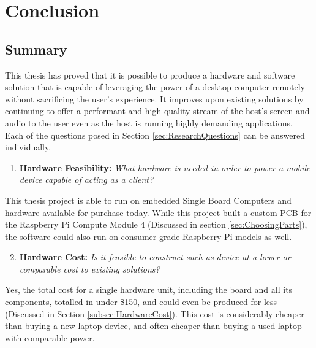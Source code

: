 \chapter{Conclusion} %

\label{Chapter7} %


\section{Summary}\label{sec:ConclusionSummary}

This thesis has proved that it is possible to produce a hardware and software solution that is capable of leveraging the power of a desktop computer remotely without sacrificing the user's experience.
It improves upon existing solutions by continuing to offer a performant and high-quality stream of the host's screen and audio to the user even as the host is running highly demanding applications.
Each of the questions posed in Section \ref{sec:ResearchQuestions} can be answered individually.

\begin{enumerate}
  \setcounter{enumi}{0} %
  \item \textbf{Hardware Feasibility:} \emph{What hardware is needed in order to power a mobile device capable of acting as a client?}
\end{enumerate}

\noindent
This thesis project is able to run on embedded Single Board Computers and hardware available for purchase today.
While this project built a custom PCB for the Raspberry Pi Compute Module 4 (Discussed in section \ref{sec:ChoosingParts}), the software could also run on consumer-grade Raspberry Pi models as well.

\begin{enumerate}
  \setcounter{enumi}{1} %
  \item \textbf{Hardware Cost:} \emph{Is it feasible to construct such as device at a lower or comparable cost to existing solutions?}
\end{enumerate}

\noindent
Yes, the total cost for a single hardware unit, including the board and all its components, totalled in under \$150, and could even be produced for less (Discussed in Section \ref{subsec:HardwareCost}).
This cost is considerably cheaper than buying a new laptop device, and often cheaper than buying a used laptop with comparable power.

